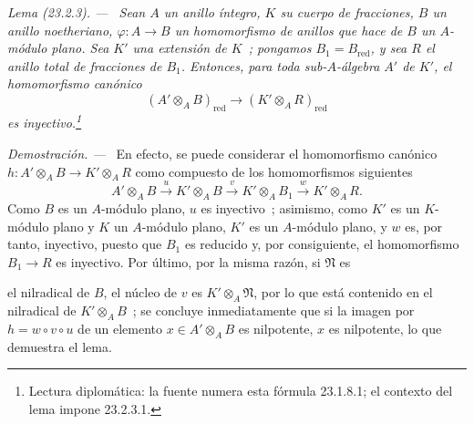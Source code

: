 \documentclass[10pt,oneside]{book}
\makeatletter
\newcommand{\setmanualcurrentlabel}[1]{\def\@currentlabel{#1}}
\newcommand{\oldpage}[2][]{%
  \setcounter{footnote}{0}%
  \marginpar{\scriptsize\textbf{#1}~|~#2}\ignorespaces}
\newenvironment{lemma}[1][]{%
  \setmanualcurrentlabel{#1}\par\medskip\noindent\itshape Lema (#1). ---\ }{\par}
\newenvironment{proof}{%
  \par\medskip\noindent\textit{Demostración. ---\ }}{\par}
\makeatother
\begin{document}
\begin{lemma}[23.2.3]
\label{0.23.2.3-es}
Sean $A$ un anillo íntegro, $K$ su cuerpo de fracciones, $B$ un anillo
noetheriano, $\varphi:A\to B$ un homomorfismo de anillos que hace de $B$ un
$A$-módulo plano. Sea $K'$ una extensión de $K$~; pongamos
$B_1=B_{\mathrm{red}}$, y sea $R$ el anillo total de fracciones de $B_1$.
Entonces, para toda sub-$A$-álgebra $A'$ de $K'$, el homomorfismo canónico
\begin{equation}
\label{0.23.2.3.1-es}
  (A'\otimes_AB)_{\mathrm{red}}
  \longrightarrow(K'\otimes_AR)_{\mathrm{red}}
  \tag{23.2.3.1}
\end{equation}
es inyectivo.\footnote{Lectura diplomática: la fuente numera esta fórmula 23.1.8.1; el contexto del lema impone 23.2.3.1.}
\end{lemma}

\begin{proof}
En efecto, se puede considerar el homomorfismo canónico
$h:A'\otimes_AB\to K'\otimes_AR$ como compuesto de los homomorfismos siguientes
\[
  A'\otimes_AB\xrightarrow{u}K'\otimes_AB
  \xrightarrow{v}K'\otimes_AB_1\xrightarrow{w}K'\otimes_AR.
\]
Como $B$ es un $A$-módulo plano, $u$ es inyectivo~; asimismo, como $K'$ es un
$K$-módulo plano y $K$ un $A$-módulo plano, $K'$ es un $A$-módulo plano, y
$w$ es, por tanto, inyectivo, puesto que $B_1$ es reducido y, por consiguiente, el homomorfismo
$B_1\to R$ es inyectivo. Por último, por la misma razón, si $\mathfrak N$ es

\oldpage[0\textsubscript{IV-1}]{218}

el nilradical de $B$, el núcleo de $v$ es $K'\otimes_A\mathfrak N$, por lo que está
contenido en el nilradical de $K'\otimes_AB$~; se concluye inmediatamente que si
la imagen por $h=w\circ v\circ u$ de un elemento $x\in A'\otimes_AB$ es
nilpotente, $x$ es nilpotente, lo que demuestra el lema.
\end{proof}
\end{document}
